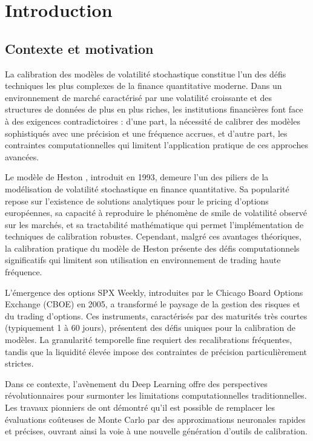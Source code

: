 \chapter{Introduction}

\section{Contexte et motivation}

La calibration des modèles de volatilité stochastique constitue l'un des défis techniques les plus complexes de la finance quantitative moderne. Dans un environnement de marché caractérisé par une volatilité croissante et des structures de données de plus en plus riches, les institutions financières font face à des exigences contradictoires : d'une part, la nécessité de calibrer des modèles sophistiqués avec une précision et une fréquence accrues, et d'autre part, les contraintes computationnelles qui limitent l'application pratique de ces approches avancées.

Le modèle de Heston \citep{heston1993closed}, introduit en 1993, demeure l'un des piliers de la modélisation de volatilité stochastique en finance quantitative. Sa popularité repose sur l'existence de solutions analytiques pour le pricing d'options européennes, sa capacité à reproduire le phénomène de smile de volatilité observé sur les marchés, et sa tractabilité mathématique qui permet l'implémentation de techniques de calibration robustes. Cependant, malgré ces avantages théoriques, la calibration pratique du modèle de Heston présente des défis computationnels significatifs qui limitent son utilisation en environnement de trading haute fréquence.

L'émergence des options SPX Weekly, introduites par le Chicago Board Options Exchange (CBOE) en 2005, a transformé le paysage de la gestion des risques et du trading d'options. Ces instruments, caractérisés par des maturités très courtes (typiquement 1 à 60 jours), présentent des défis uniques pour la calibration de modèles. La granularité temporelle fine requiert des recalibrations fréquentes, tandis que la liquidité élevée impose des contraintes de précision particulièrement strictes.

Dans ce contexte, l'avènement du Deep Learning offre des perspectives révolutionnaires pour surmonter les limitations computationnelles traditionnelles. Les travaux pionniers de \citet{bayer2018deep} ont démontré qu'il est possible de remplacer les évaluations coûteuses de Monte Carlo par des approximations neuronales rapides et précises, ouvrant ainsi la voie à une nouvelle génération d'outils de calibration.

